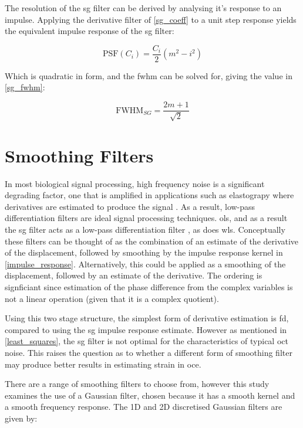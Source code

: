 The resolution of the \ac{sg} filter can be derived by analysing it's response to an impulse. Applying the derivative filter of \autoref{sg_coeff} to a unit step response yields the equivalent impulse response of the \ac{sg} filter:

\begin{equation}
	\text{PSF} (C_i)=\frac{C_i}{2}(m^2 - i^2)
	\label{impulse_response}
\end{equation}

Which is quadratic in form, and the \ac{fwhm} can be solved for, giving the value in \autoref{sg_fwhm}:

\begin{equation}
	\label{sg_fwhm}
	\text{FWHM}_{SG} = \frac{2m+1}{\sqrt{2}}
\end{equation}

\section{Smoothing Filters}
In most biological signal processing, high frequency noise is a significant degrading factor, one that is amplified in applications such as elastograpy where derivatives are estimated to produce the signal \cite{usui_digital_1982}. As a result, low-pass differentiation filters are ideal signal processing techniques. \ac{ols}, and as a result the \ac{sg} filter acts as a low-pass differentiation filter \cite{luo_axial_2004}, as does \ac{wls}.
Conceptually these filters can be thought of as the combination of an estimate of the derivative of the displacement, followed by smoothing by the impulse response kernel in \ref{impulse_response}. Alternatively, this could be applied as a smoothing of the displacement, followed by an estimate of the derivative. The ordering is signficiant since estimation of the phase difference from the complex variables is not a linear operation (given that it is a complex quotient).

Using this two stage structure, the simplest form of derivative estimation is \ac{fd}, compared to using the \ac{sg} impulse response estimate. However as mentioned in \autoref{least_squares}, the \ac{sg} filter is not optimal for the characteristics of typical \ac{oct} noise.
This raises the question as to whether a different form of smoothing filter may produce better results in estimating strain in \ac{oce}. 

There are a range of smoothing filters to choose from, however this study examines the use of a Gaussian filter, chosen because it has a smooth kernel and a smooth frequency response. The 1D and 2D discretised Gaussian filters are given by:


